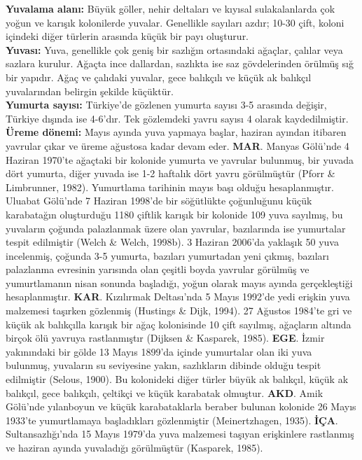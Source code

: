 \documentclass[
  a4paper,
  DIV=11,
  numbers=noendperiod]{scrreprt}
\begin{document}
\textbf{Yuvalama alanı:} Büyük göller, nehir deltaları ve kıyısal
sulakalanlarda çok yoğun ve karışık kolonilerde yuvalar. Genellikle
sayıları azdır; 10-30 çift, koloni içindeki diğer türlerin arasında
küçük bir payı oluşturur.\\
\textbf{Yuvası:} Yuva, genellikle çok geniş bir sazlığın ortasındaki
ağaçlar, çalılar veya sazlara kurulur. Ağaçta ince dallardan, sazlıkta
ise saz gövdelerinden örülmüş sığ bir yapıdır. Ağaç ve çalıdaki yuvalar,
gece balıkçılı ve küçük ak balıkçıl yuvalarından belirgin şekilde
küçüktür.\\
\textbf{Yumurta sayısı:} Türkiye'de gözlenen yumurta sayısı 3-5 arasında
değişir, Türkiye dışında ise 4-6'dır. Tek gözlemdeki yavru sayısı 4
olarak kaydedilmiştir.\\
\textbf{Üreme dönemi:} Mayıs ayında yuva yapmaya başlar, haziran ayından
itibaren yavrular çıkar ve üreme ağustosa kadar devam eder.
\textbf{MAR}. Manyas Gölü'nde 4 Haziran 1970'te ağaçtaki bir kolonide
yumurta ve yavrular bulunmuş, bir yuvada dört yumurta, diğer yuvada ise
1-2 haftalık dört yavru görülmüştür (Pforr \& Limbrunner, 1982).
Yumurtlama tarihinin mayıs başı olduğu hesaplanmıştır. Uluabat Gölü'nde
7 Haziran 1998'de bir söğütlükte çoğunluğunu küçük karabatağın
oluşturduğu 1180 çiftlik karışık bir kolonide 109 yuva sayılmış, bu
yuvaların çoğunda palazlanmak üzere olan yavrular, bazılarında ise
yumurtalar tespit edilmiştir (Welch \& Welch, 1998b). 3 Haziran 2006'da
yaklaşık 50 yuva incelenmiş, çoğunda 3-5 yumurta, bazıları yumurtadan
yeni çıkmış, bazıları palazlanma evresinin yarısında olan çeşitli boyda
yavrular görülmüş ve yumurtlamanın nisan sonunda başladığı, yoğun olarak
mayıs ayında gerçekleştiği hesaplanmıştır. \textbf{KAR}. Kızılırmak
Deltası'nda 5 Mayıs 1992'de yedi erişkin yuva malzemesi taşırken
gözlenmiş (Hustings \& Dijk, 1994). 27 Ağustos 1984'te gri ve küçük ak
balıkçılla karışık bir ağaç kolonisinde 10 çift sayılmış, ağaçların
altında birçok ölü yavruya rastlanmıştır (Dijksen \& Kasparek, 1985).
\textbf{EGE}. İzmir yakınındaki bir gölde 13 Mayıs 1899'da içinde
yumurtalar olan iki yuva bulunmuş, yuvaların su seviyesine yakın,
sazlıkların dibinde olduğu tespit edilmiştir (Selous, 1900). Bu
kolonideki diğer türler büyük ak balıkçıl, küçük ak balıkçıl, gece
balıkçılı, çeltikçi ve küçük karabatak olmuştur. \textbf{AKD}. Amik
Gölü'nde yılanboyun ve küçük karabataklarla beraber bulunan kolonide 26
Mayıs 1933'te yumurtlamaya başladıkları gözlenmiştir (Meinertzhagen,
1935). \textbf{İÇA}. Sultansazlığı'nda 15 Mayıs 1979'da yuva malzemesi
taşıyan erişkinlere rastlanmış ve haziran ayında yuvaladığı görülmüştür
(Kasparek, 1985).
\end{document}
